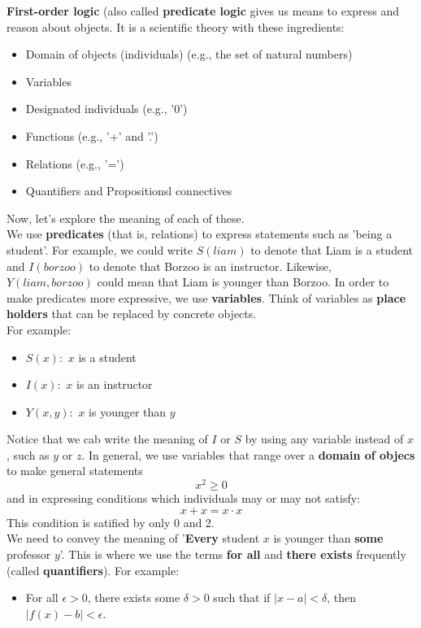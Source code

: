 \documentclass[english, 11pt]{article}
\begin{document}
  \begin{defn}\label{first-order-logic}
  \textbf{First-order logic} (also called \textbf{predicate logic} gives us means to express and reason about objects. It is a scientific theory with these ingredients:
  \begin{itemize}
    \item Domain of objects (individuals) (e.g., the set of natural numbers)
    \item Variables
    \item Designated individuals (e.g., '0')
    \item Functions (e.g., '+' and '.')
    \item Relations (e.g., '=')
    \item Quantifiers and Propositionsl connectives
  \end{itemize}
  Now, let's explore the meaning of each of these. \\
  We use \textbf{predicates} (that is, relations) to express statements such as 'being a student'. For example, we could write $S(liam)$ to denote that Liam is a student and $I(borzoo)$ to denote that Borzoo is an instructor. Likewise, $Y(liam,borzoo)$ could mean that Liam is younger than Borzoo. In order to make predicates more expressive, we use \textbf{variables}. Think of variables as \textbf{place holders} that can be replaced by concrete objects. \\
  For example:
  \begin{itemize}
    \item $S(x):$ $x$ is a student
    \item $I(x):$ $x$ is an instructor
    \item $Y(x,y):$ $x$ is younger than $y$
  \end{itemize}
  Notice that we cab write the meaning of $I$ or $S$ by using any variable instead of $x$, such as $y$ or $z$. In general, we use variables that range over a \textbf{domain of objecs} to make general statements
  \[ x^2 \geq 0 \]
  and in expressing conditions which individuals may or may not satisfy:
  \[ x + x = x\cdot x \]
  This condition is satified by only 0 and 2. \\
  We need to convey the meaning of '\textbf{Every} student $x$ is younger than \textbf{some} professor $y$'. This is where we use the terms \textbf{for all} and \textbf{there exists} frequently (called \textbf{quantifiers}). For example:
  \begin{itemize}
    \item For all $\epsilon > 0$, there exists some $\delta > 0$ such that if $|x-a| < \delta$, then $|f(x) - b| < \epsilon$.

\end{itemize}
\end{defn}
\end{document}
